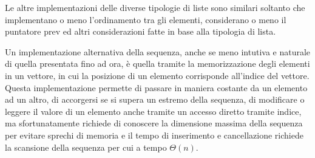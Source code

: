 Le altre implementazioni delle diverse tipologie di liste sono similari soltanto
che implementano o meno l'ordinamento tra gli elementi, considerano o meno il puntatore prev
ed altri considerazioni fatte in base alla tipologia di lista.

Un implementazione alternativa della sequenza, anche se meno intutiva e naturale
di quella presentata fino ad ora, è quella tramite la memorizzazione degli elementi
in un vettore, in cui la posizione di un elemento corrisponde all'indice del vettore.\newline
Questa implementazione permette di passare in maniera costante da un elemento ad un altro,
di accorgersi se si supera un estremo della sequenza, di modificare o leggere il valore
di un elemento anche tramite un accesso diretto tramite indice, ma sfortunatamente
richiede di conoscere la dimensione massima della sequenza per evitare sprechi di memoria
e il tempo di inserimento e cancellazione richiede la scansione della sequenza per cui a tempo $\Theta(n)$.
